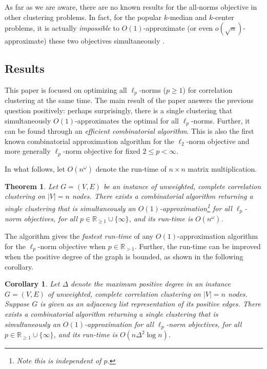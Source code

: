 \documentclass[11pt]{article}
\newtheorem{theorem}{Theorem}
\newtheorem{corollary}{Corollary}
\begin{document}
As far as we are aware, there are no known results for the all-norms objective in other clustering problems. In fact, for the popular $k$-median and $k$-center problems, it is actually \textit{impossible} to $O(1)$-approximate (or even $o(\sqrt{n})$-approximate) these two objectives simultaneously \cite{2018bicriteria}.




\subsection{Results}
This paper is focused on optimizing all $\ell_p$-norms ($p \geq 1$) for correlation clustering at the same time.  The main result of the paper answers the previous question positively: perhaps surprisingly, there is a single clustering that simultaneously $O(1)$-approximates the optimal for all $\ell_p$-norms. Further, it can be found through an \emph{efficient combinatorial algorithm}.   This is also the first known combinatorial approximation algorithm for the $\ell_2$-norm objective and more generally $\ell_p$-norm objective for fixed $2 \leq p < \infty$.  

In what follows, let $O(n^\omega)$ denote the run-time of $n \times n$ matrix multiplication.  


\begin{theorem}\label{thm: main-acm}
Let $G=(V,E)$ be an instance of unweighted, complete correlation clustering on $|V|=n$ nodes. There exists a combinatorial algorithm returning a single clustering that is simultaneously an $O(1)$-approximation\footnote{Note this is independent of $p$.} for all $\ell_p$-norm objectives, for all $p\in \mathbb{R}_{\geq 1} \cup \{\infty\}$, and its run-time is $O(n^\omega)$.
\end{theorem}


The algorithm gives the \emph{fastest run-time} of any $O(1)$-approximation algorithm for the $\ell_p$-norm objective when $p  \in \mathbb{R}_{>1}$.
Further, the run-time can be improved  when the positive degree of the graph is bounded, as shown in the following corollary. 

\begin{corollary}\label{cor: main-acm-sparse}
Let $\Delta$ denote the maximum positive degree in an instance $G=(V,E)$ of unweighted, complete correlation clustering on $|V|=n$ nodes. Suppose $G$ is given as an adjacency list representation of its positive edges. There exists a combinatorial algorithm returning a single clustering that is simultaneously an $O(1)$-approximation for all $\ell_p$-norm objectives, for all $p\in \mathbb{R}_{\geq 1} \cup \{\infty\}$, and its run-time is $O(n\Delta^2 \log n)$.
\end{corollary}
\end{document}
